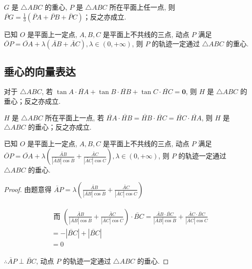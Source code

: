 \begin{proposition}
    $G$ 是 $\triangle ABC$ 的重心, $P$ 是 $\triangle ABC$ 所在平面上任一点, 则 $\lvec{PG}=\frac{1}{3}(\lvec{PA}+\lvec{PB}+\lvec{PC})$；反之亦成立.
\end{proposition}

\begin{proposition}
    已知 $O$ 是平面上一定点, $A, B, C$ 是平面上不共线的三点, 动点 $P$ 满足 $\lvec{OP}=\lvec{OA}+\lambda(\lvec{AB}+\lvec{AC}), \lambda \in(0,+\infty)$, 则 $P$ 的轨迹一定通过 $\triangle ABC$ 的重心.
\end{proposition}

\subsection{垂心的向量表达}
\begin{proposition}
    对于 $\triangle ABC$, 若 $\tan A \cdot \lvec{HA}+\tan B \cdot \lvec{HB}+\tan C \cdot \lvec{HC}=\boldsymbol{0}$, 则 $H$ 是 $\triangle ABC$ 的垂心；反之亦成立.
\end{proposition}

\begin{proposition}
    $H$ 是 $\triangle ABC$ 所在平面上一点, 若 $\lvec{HA} \cdot \lvec{HB}=\lvec{HB} \cdot \lvec{HC}=\lvec{HC} \cdot \lvec{HA}$, 则 $H$ 是 $\triangle ABC$ 的垂心；反之亦成立.
\end{proposition}

\begin{proposition}
    已知 $O$ 是平面上一定点, $A, B, C$ 是平面上不共线的三点, 动点 $P$ 满足
    $\lvec{OP}=\lvec{OA}+\lambda\left(\frac{\lvec{AB}}{|\lvec{AB}| \cos B}+\frac{\lvec{AC}}{|\lvec{AC}| \cos C}\right), \lambda \in(0,+\infty)$, 则 $P$ 的轨迹一定通过 $\triangle ABC$ 的垂心.
\end{proposition}

\begin{proof}
    由题意得 $\lvec{AP}=\lambda\left(\frac{\lvec{AB}}{|\lvec{AB}| \cos B}+\frac{\lvec{AC}}{|\lvec{AC}| \cos C}\right)$

    \begin{align*}
        \begin{aligned}
             & \text { 而 }\left(\frac{\lvec{AB}}{|\lvec{AB}| \cos B}+\frac{\lvec{AC}}{|\lvec{AC}| \cos C}\right) \cdot \lvec{BC}=\frac{\lvec{AB} \cdot \lvec{BC}}{|\lvec{AB}| \cos B}+\frac{\lvec{AC} \cdot \lvec{BC}}{|\lvec{AC}| \cos C} \\
             & =-|\lvec{BC}|+|\lvec{BC}|                                                                                                                                                                                                   \\
             & =0
        \end{aligned}
    \end{align*}

    $\therefore \lvec{AP} \perp \lvec{BC}$, 动点 $P$ 的轨迹一定通过 $\triangle ABC$ 的垂心.
\end{proof}

